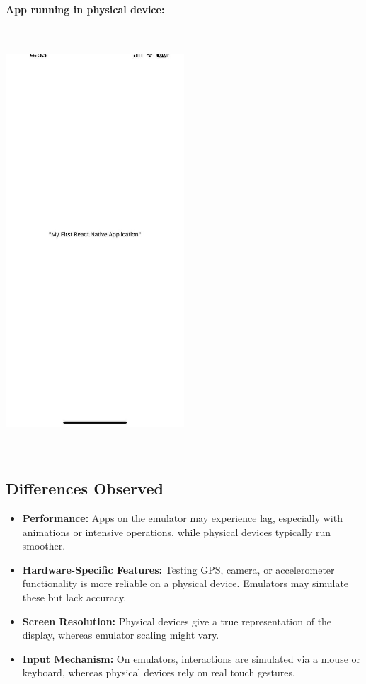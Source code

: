 \documentclass[12pt]{article}
\begin{document}
\textbf{App running in physical device:}
\begin{center}
    \includegraphics[width=0.5\textwidth, height=16cm]{images/physicaldevice.png} 
\end{center}

\subsection*{Differences Observed}
\begin{itemize}
    \item \textbf{Performance:} Apps on the emulator may experience lag, especially with animations or intensive operations, while physical devices typically run smoother.
    \item \textbf{Hardware-Specific Features:} Testing GPS, camera, or accelerometer functionality is more reliable on a physical device. Emulators may simulate these but lack accuracy.
    \item \textbf{Screen Resolution:} Physical devices give a true representation of the display, whereas emulator scaling might vary.
    \item \textbf{Input Mechanism:} On emulators, interactions are simulated via a mouse or keyboard, whereas physical devices rely on real touch gestures.
\end{itemize}
\end{document}
